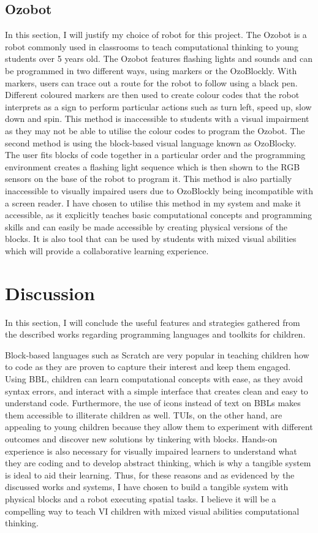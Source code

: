 \documentclass[oneside,%
                    author={Malak Hajji},
                    degree={BSc},
                    title={Designing An Accessible Computational Toolkit For Students},
                  subtitle={With Mixed Visual Abilities}]{dissertation}
\begin{document}
\subsection{Ozobot}
In this section, I will justify my choice of robot for this project. The Ozobot is a robot commonly used in classrooms to teach computational thinking to young students over 5 years old. The Ozobot features flashing lights and sounds and can be programmed in two different ways, using markers or the OzoBlockly. 
With markers, users can trace out a route for the robot to follow using a black pen. Different coloured markers are then used to create colour codes that the robot interprets as a sign to perform particular actions such as turn left, speed up, slow down and spin. This method is inaccessible to students with a visual impairment as they may not be able to utilise the colour codes to program the Ozobot. The second method is using the block-based visual language known as OzoBlocky. The user fits blocks of code together in a particular order and the programming environment creates a flashing light sequence which is then shown to the RGB sensors on the base of the robot to program it. This method is also partially inaccessible to visually impaired users due to OzoBlockly being incompatible with a screen reader. I have chosen to utilise this method in my system and make it accessible, as it explicitly teaches basic computational concepts and programming skills and can easily be made accessible by creating physical versions of the blocks. It is also tool that can be used by students with mixed visual abilities which will provide a collaborative learning experience.


\section{Discussion} 
In this section, I will conclude the useful features and strategies gathered from the described works regarding programming languages and toolkits for children. 

Block-based languages such as Scratch are very popular in teaching children how to code as they are proven to capture their interest and keep them engaged. Using BBL, children can learn computational concepts with ease, as they avoid syntax errors, and interact with a simple interface that creates clean and easy to understand code. Furthermore, the use of icons instead of text on BBLs makes them accessible to illiterate children as well. 
TUIs, on the other hand, are appealing to young children because they allow them to experiment with different outcomes and discover new solutions by tinkering with blocks. 
Hands-on experience is also necessary for visually impaired learners to understand what they are coding and to develop abstract thinking, which is why a tangible system is ideal to aid their learning. Thus, for these reasons and as evidenced by the discussed works and systems, I have chosen to build a tangible system with physical blocks and a robot executing spatial tasks. I believe it will be a compelling way to teach VI children with mixed visual abilities computational thinking.
\end{document}
